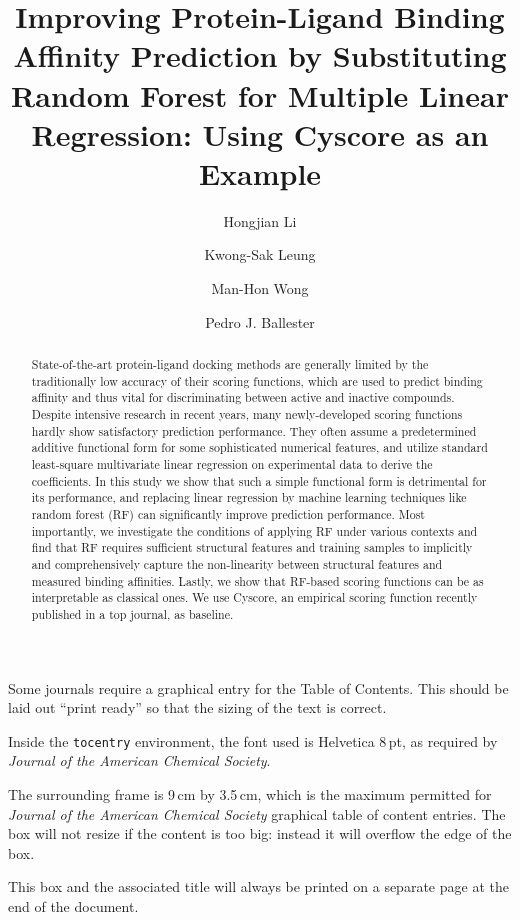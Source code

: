 \documentclass[journal=jacsat,manuscript=article]{achemso}
\author{Hongjian Li}
\author{Kwong-Sak Leung}
\author{Man-Hon Wong}
\affiliation[Chinese University of Hong Kong]
{Department of Computer Science and Engineering, Chinese University of Hong Kong, Shatin, New Territories, Hong Kong}
\author{Pedro J. Ballester}
\affiliation[European Bioinformatics Institute]
{European Bioinformatics Institute, Wellcome Trust Genome Campus, Hinxton, Cambridge - CB10 1SD, UK}
\title[RF::Cyscore]{Improving Protein-Ligand Binding Affinity Prediction by Substituting Random Forest for Multiple Linear Regression: Using Cyscore as an Example}
\begin{document}
\begin{tocentry}

Some journals require a graphical entry for the Table of Contents.
This should be laid out ``print ready'' so that the sizing of the
text is correct.

Inside the \texttt{tocentry} environment, the font used is Helvetica
8\,pt, as required by \emph{Journal of the American Chemical
Society}.

The surrounding frame is 9\,cm by 3.5\,cm, which is the maximum
permitted for  \emph{Journal of the American Chemical Society}
graphical table of content entries. The box will not resize if the
content is too big: instead it will overflow the edge of the box.

This box and the associated title will always be printed on a
separate page at the end of the document.

\end{tocentry}

\begin{abstract}

State-of-the-art protein-ligand docking methods are generally limited by the traditionally low accuracy of their scoring functions, which are used to predict binding affinity and thus vital for discriminating between active and inactive compounds. Despite intensive research in recent years, many newly-developed scoring functions hardly show satisfactory prediction performance. They often assume a predetermined additive functional form for some sophisticated numerical features, and utilize standard least-square multivariate linear regression on experimental data to derive the coefficients. In this study we show that such a simple functional form is detrimental for its performance, and replacing linear regression by machine learning techniques like random forest (RF) can significantly improve prediction performance. Most importantly, we investigate the conditions of applying RF under various contexts and find that RF requires sufficient structural features and training samples to implicitly and comprehensively capture the non-linearity between structural features and measured binding affinities. Lastly, we show that RF-based scoring functions can be as interpretable as classical ones. We use Cyscore, an empirical scoring function recently published in a top journal, as baseline.

\end{abstract}
\end{document}
